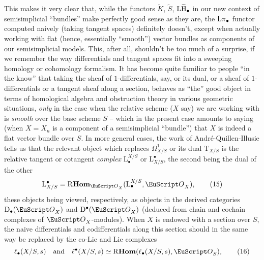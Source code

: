 \label{sec:132}%
This makes it very clear that, while the functors $\widetilde K$,
$\widetilde S$, $\operatorname{L\widetilde H}_\bullet$ in our new context of semisimplicial
``bundles'' make perfectly good sense as they are, the $\operatorname{L\pi}_\bullet$
functor computed naively (taking tangent spaces) definitely doesn't,
except when actually working with flat (hence, essentially ``smooth'')
vector bundles as components of our semisimplicial models. This, after
all, shouldn't be too much of a surprise, if we remember the way
differentials and tangent spaces fit into a sweeping homology or
cohomology formalism. It has become quite familiar to people ``in the
know'' that taking the sheaf of $1$-differentials, say, or its dual,
or a sheaf of $1$-differentials or a tangent sheaf along a section,
behaves as ``the'' good object in terms of homological
algebra and obstruction theory in various geometric situations,
\emph{only} in the case when the relative scheme ($X$ say) we are
working with is \emph{smooth} over the base scheme $S$ -- which in the
present case amounts to saying (when $X=X_n$ is a component of a
semisimplicial ``bundle'') that $X$ is indeed a flat vector bundle
over $S$. In more general cases, the work of
André-Quillen-Illusie tells us that the relevant object
which replaces $\Omega^1_{X/S}$ or its dual $\mathrm T_{X/S}$ is the
relative tangent or cotangent \emph{complex} $\mathrm L_\bullet^{X/S}$
or $\mathrm L^\bullet_{X/S}$, the second being the dual of the other
\begin{equation}
  \label{eq:132.15}
  \mathrm L^\bullet_{X/S} = \RbHom_{\scrO_X}(\mathrm L^{X/S}_\bullet,
  \scrO_X),\tag{15} 
\end{equation}
these objects being viewed, respectively, as objects in the derived
categories $\D_\bullet(\scrO_X)$ and $\D^\bullet(\scrO_X)$ (deduced
from chain and cochain complexes of $\scrO_X$-modules). When $X$ is
endowed with a section over $S$, the naive differentials and
codifferentials along this section should in the same way be replaced
by the co-Lie and Lie complexes
\begin{equation}
  \label{eq:132.16}
  \ell_\bullet(X/S,s) \quad\text{and}\quad
  \ell^\bullet(X/S,s)\simeq
  \RbHom(\ell_\bullet(X/S,s), \scrO_S),\tag{16}
\end{equation}
